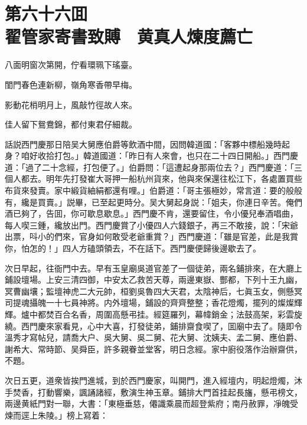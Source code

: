 
\chapter*{第六十六囬　\\翟管家寄書致賻　黄真人煉度薦亡}


\begin{myquote}
八面明窗次第開，佇看環珮下瑤臺。

閨門春色連新柳，嶺角寒香帶早梅。

影動花梢明月上，風敲竹徑故人來。

佳人留下鴛鴦錦，都付東君仔細裁。
\end{myquote}

話説西門慶那日陪吴大舅應伯爵等飲酒中間，因問韓道國：「客夥中標船幾時起身？咱好收拾打包。」韓道國道：「昨日有人來會，也只在二十四日開船。」西門慶道：「過了二十念經，打包便了。」伯爵問：「這遭起身那兩位去？」西門慶道：「三個人都去。明年先打發崔大哥押一船杭州貨來，他與來保還往松江下，各處置買些布貨來發賣。家中緞貨紬絹都還有哩。」伯爵道：「哥主張極妙，常言道：要的般般有，纔是買賣。」説畢，已至起更時分。吴大舅起身説：「姐夫，你連日辛苦。俺們酒已夠了，告囬，你可歇息歇息。」西門慶不肯，還要留住，令小優兒奉酒唱曲，每人喫三鍾，纔放出門。西門慶賞了小優四人六錢銀子，再三不敢接，說：「宋爺出票，呌小的們來，官身如何敢受老爺重賞？」西門慶道：「雖是官差，此是我賞你，怕怎的！」四人方磕頭領去，不在話下。西門慶便歸後邊歇去了。

次日早起，往衙門中去。早有玉皇廟吳道官差了一個徒弟，兩名鋪排來，在大廳上鋪設壇場。上安三清四御，中安太乙救苦天尊，兩邊東嶽、酆都，下列十王九幽，冥曹幽壤；監壇神虎二大元帥，桓劉吳魯四大天君，太陰神后，七眞玉女，側懸冥司提魂攝魄一十七員神將。内外壇場，鋪設的齊齊整整；香花燈燭，擺列的燦燦輝輝。爐中都焚百合名香，周圍高懸弔挂。經筵羅列，幕幃銷金；法鼓高架，彩雲旋繞。西門慶來家看見，心中大喜，打發徒弟，鋪排齋食喫了，囬廟中去了。隨即令溫秀才寫帖兒，請喬大户、吳大舅、吳二舅、花大舅、沈姨夫、孟二舅、應伯爵、謝希大、常時節、吴舜臣，許多親眷並堂客，明日念經。家中廚役落作治辦齋供，不題。

次日五更，道衆皆挨門進城，到於西門慶家，叫開門，進入經壇内，明起燈燭，沐手焚香，打動響樂，諷誦諸經，敷演生神玉章。鋪排大門首挂起長旛，懸弔榜文，兩邊黄紙門對一聯，大書：「東極垂慈，僊識乘晨而超登紫府；南丹赦罪，凈魄受煉而逕上朱陵。」榜上寫着：

